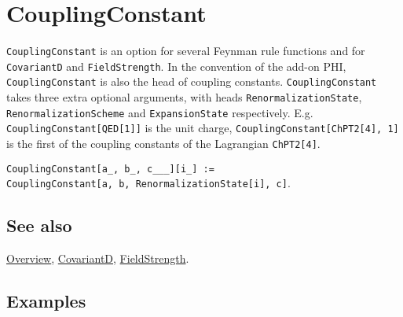 \documentclass[../FeynCalcManual.tex]{subfiles}
\begin{document}
\hypertarget{couplingconstant}{
\section{CouplingConstant}\label{couplingconstant}}

\texttt{CouplingConstant} is an option for several Feynman rule
functions and for \texttt{CovariantD} and \texttt{FieldStrength}. In the
convention of the add-on PHI, \texttt{CouplingConstant} is also the head
of coupling constants. \texttt{CouplingConstant} takes three extra
optional arguments, with heads \texttt{RenormalizationState},
\texttt{RenormalizationScheme} and \texttt{ExpansionState} respectively.
E.g. \texttt{CouplingConstant[\allowbreak{}QED[\allowbreak{}1]]} is the
unit charge,
\texttt{CouplingConstant[\allowbreak{}ChPT2[\allowbreak{}4],\ \allowbreak{}1]}
is the first of the coupling constants of the Lagrangian
\texttt{ChPT2[\allowbreak{}4]}.

\texttt{CouplingConstant[\allowbreak{}a_,\ \allowbreak{}b_,\ \allowbreak{}c___][\allowbreak{}i_] := CouplingConstant[\allowbreak{}a,\ \allowbreak{}b,\ \allowbreak{}RenormalizationState[\allowbreak{}i],\ \allowbreak{}c]}.

\subsection{See also}

\hyperlink{toc}{Overview}, \hyperlink{covariantd}{CovariantD},
\hyperlink{fieldstrength}{FieldStrength}.

\subsection{Examples}
\end{document}
